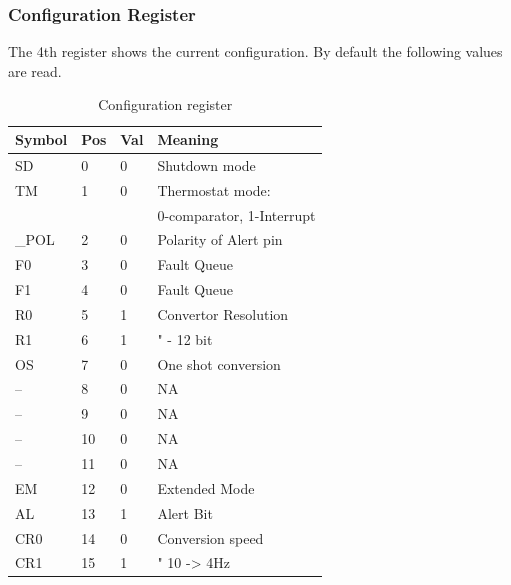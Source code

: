 \documentclass{article}
\begin{document}
\subsubsection{Configuration Register}
The 4th register shows the current configuration. By default the following values are read.
\begin{table}[H]
\centering
 \begin{tabular}{|l|l|l|l|}
 \hline Symbol & Pos & Val & Meaning\\ 
 \hline SD & 0 & 0 & Shutdown mode\\
 \hline TM & 1 & 0 & Thermostat mode: \\
     &   &   & 0-comparator, 1-Interrupt \\
 \hline \_POL & 2 & 0 & Polarity of Alert pin\\
 \hline F0 & 3 & 0 & Fault Queue\\
 \hline F1 & 4 & 0 & Fault Queue\\
 \hline R0 & 5 & 1 & Convertor Resolution\\
 \hline R1 & 6 & 1 & " - 12 bit \\
 \hline OS & 7 & 0 & One shot conversion\\
 \hline -- & 8 & 0 & NA \\
 \hline -- & 9 & 0 & NA \\
 \hline -- & 10 & 0 & NA \\
 \hline -- & 11 & 0 & NA \\
 \hline EM & 12 & 0 & Extended Mode\\
 \hline AL & 13 & 1 & Alert Bit\\
 \hline CR0 & 14 & 0 & Conversion speed\\
 \hline CR1 & 15 & 1 & " 10 -> 4Hz\\
 \hline 
 \end{tabular} 
\caption{Configuration register}
\end{table}
\end{document}
